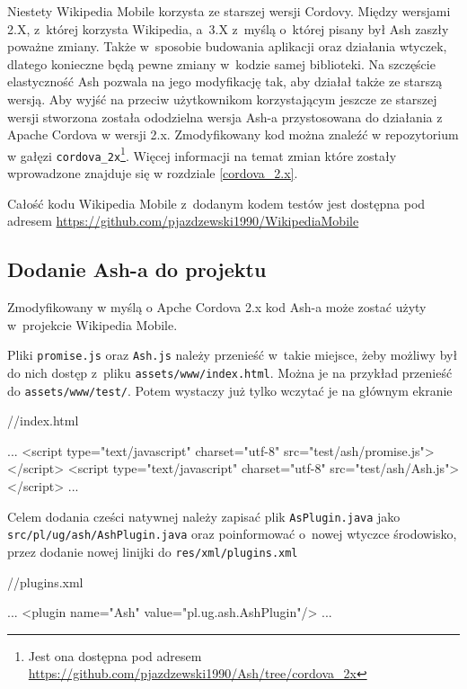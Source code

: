 \documentclass[brudnopis]{xmgr}
\begin{document}
Niestety Wikipedia Mobile korzysta ze starszej wersji Cordovy. Między wersjami 2.X, z~której korzysta Wikipedia, a~3.X z~myślą o~której pisany był Ash zaszły poważne zmiany. Także w~sposobie budowania aplikacji oraz działania wtyczek, dlatego konieczne będą pewne zmiany w~kodzie samej biblioteki. Na szczęście elastyczność Ash pozwala na jego modyfikację tak, aby działał także ze starszą wersją. Aby wyjść na przeciw użytkownikom korzystającym jeszcze ze starszej wersji stworzona została ododzielna wersja Ash-a przystosowana do działania z Apache Cordova w wersji 2.x. Zmodyfikowany kod można znaleźć w repozytorium w gałęzi  \texttt{cordova\_2x}\footnote{Jest ona dostępna pod adresem \url{https://github.com/pjazdzewski1990/Ash/tree/cordova\_2x} }. Więcej informacji na temat zmian które zostały wprowadzone znajduje się w rozdziale \ref{cordova_2.x}. 

Całość kodu Wikipedia Mobile z~dodanym kodem testów jest dostępna pod adresem \url{https://github.com/pjazdzewski1990/WikipediaMobile} 

\subsection{Dodanie Ash-a do projektu}

Zmodyfikowany w myślą o Apche Cordova 2.x kod Ash-a może zostać użyty w~projekcie Wikipedia Mobile. 

Pliki \texttt{promise.js} oraz \texttt{Ash.js} należy przenieść w~takie miejsce, żeby możliwy był do nich dostęp z~pliku \texttt{assets/www/index.html}. Można je na przykład przenieść do \texttt{assets/www/test/}. Potem wystaczy już tylko wczytać je na głównym ekranie 

\begin{htmlcode}
   //index.html
  
  ...
  <script type="text/javascript" 
        charset="utf-8" src="test/ash/promise.js"></script>
  <script type="text/javascript" 
        charset="utf-8" src="test/ash/Ash.js"></script>
  ...

\end{htmlcode}

Celem dodania cześci natywnej należy zapisać plik \texttt{AsPlugin.java} jako \texttt{src/pl/ug/ash/AshPlugin.java} oraz poinformować o~nowej wtyczce środowisko, przez dodanie nowej linijki do \texttt{res/xml/plugins.xml}

\begin{htmlcode}
   //plugins.xml
  
  ...
  <plugin name="Ash" value="pl.ug.ash.AshPlugin"/>
  ...

\end{htmlcode}
\end{document}
